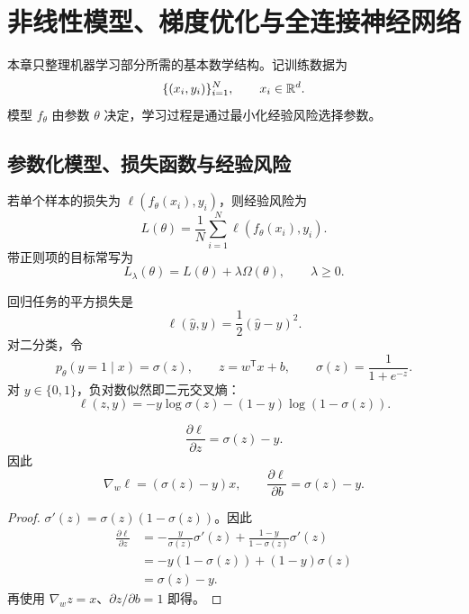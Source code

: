 %
%

\chapter{非线性模型、梯度优化与全连接神经网络}

本章只整理机器学习部分所需的基本数学结构。记训练数据为
\[
\{(x_i,y_i)\}_{i=1}^N,
\qquad x_i\in\mathbb{R}^d.
\]
模型 $f_\theta$ 由参数 $\theta$ 决定，学习过程是通过最小化经验风险选择参数。

\section{参数化模型、损失函数与经验风险}

\begin{definition}[经验风险]
若单个样本的损失为 $\ell(f_\theta(x_i),y_i)$，则经验风险为
\[
L(\theta)=\frac1N\sum_{i=1}^N
\ell(f_\theta(x_i),y_i).
\]
带正则项的目标常写为
\[
L_\lambda(\theta)=L(\theta)+\lambda\Omega(\theta),
\qquad \lambda\ge0.
\]
\end{definition}

回归任务的平方损失是
\[
\ell(\widehat y,y)=\frac12(\widehat y-y)^2.
\]
对二分类，令
\[
p_\theta(y=1\mid x)=\sigma(z),
\qquad
z=w^{\mathsf T}x+b,
\qquad
\sigma(z)=\frac1{1+e^{-z}}.
\]
对 $y\in\{0,1\}$，负对数似然即二元交叉熵：
\[
\ell(z,y)
=-y\log\sigma(z)-(1-y)\log(1-\sigma(z)).
\]

\begin{proposition}
\[
\frac{\partial\ell}{\partial z}=\sigma(z)-y.
\]
因此
\[
\nabla_w\ell=(\sigma(z)-y)x,
\qquad
\frac{\partial\ell}{\partial b}=\sigma(z)-y.
\]
\end{proposition}
\begin{proof}
$\sigma'(z)=\sigma(z)(1-\sigma(z))$。因此
\begin{align*}
\frac{\partial\ell}{\partial z}
&=-\frac{y}{\sigma(z)}\sigma'(z)
+\frac{1-y}{1-\sigma(z)}\sigma'(z)\\
&=-y(1-\sigma(z))+(1-y)\sigma(z)\\
&=\sigma(z)-y.
\end{align*}
再使用 $\nabla_wz=x$、$\partial z/\partial b=1$ 即得。
\end{proof}


